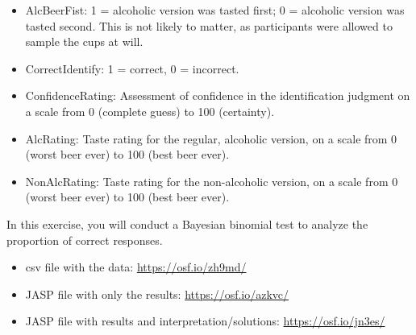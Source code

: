 \documentclass[
]{book}
\providecommand{\tightlist}{%
  \setlength{\itemsep}{0pt}\setlength{\parskip}{0pt}}
\begin{document}
\begin{itemize}
\tightlist
\item
  AlcBeerFist: 1 = alcoholic version was tasted first; 0 = alcoholic version was tasted second. This is not likely to matter, as participants were allowed to sample the cups at will.
\item
  CorrectIdentify: 1 = correct, 0 = incorrect.
\item
  ConfidenceRating: Assessment of confidence in the identification judgment on a scale from 0 (complete guess) to 100 (certainty).
\item
  AlcRating: Taste rating for the regular, alcoholic version, on a scale from 0 (worst beer ever) to 100 (best beer ever).
\item
  NonAlcRating: Taste rating for the non-alcoholic version, on a scale from 0 (worst beer ever) to 100 (best beer ever).
\end{itemize}

In this exercise, you will conduct a Bayesian binomial test to analyze the proportion of correct responses.

\begin{itemize}
\tightlist
\item
  csv file with the data: \url{https://osf.io/zh9md/}
\item
  JASP file with only the results: \url{https://osf.io/azkvc/}
\item
  JASP file with results and interpretation/solutions: \url{https://osf.io/jn3es/}
\end{itemize}
\end{document}
